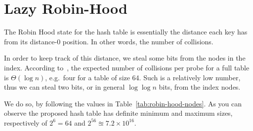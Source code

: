 \section{Lazy Robin-Hood}\label{sec:lazy-robin-hood}

The Robin Hood state for the hash table is essentially the distance each key has from its distance-0 position.
In other words, the number of collisions.

In order to keep track of this distance, we steal some bits from the nodes in the index.
According to~\cite[Corollary to Theorem~3]{robin-hood}, the expected number of collisions per probe for a full table is $\Theta(\log n)$, e.g.\ four for a table of size 64.
Such is a relatively low number, thus we can steal two bits, or in general $\log \log n$ bits, from the index nodes.

We do so, by following the values in Table~\ref{tab:robin-hood-nodes}.
As you can observe the proposed hash table has definite minimum and maximum sizes, respectively of $2^{6} = 64$ and $2^{56} \approxeq 7.2 \times 10^{16}$.

